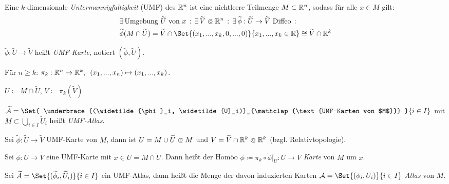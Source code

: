 \documentclass{cheat-sheet}
\newcommand{\Atlas}{\mathcal{A}} %
\theoremstyle{definition}
\begin{document}
\begin{defn}
  Eine $k$-dimensionale \emph{Untermannigfaltigkeit} (UMF) des $\mathbb{R}^n$ ist eine nichtleere Teilmenge $M \subset \mathbb{R}^n$, sodass für alle $x \in M$ gilt:
  \begin{align*}
    & \ex{\text{Umgebung $\widetilde{U}$ von $x$}} \ex{\widetilde{V} \opn \R^n} \ex{\widetilde{\phi} : \widetilde{U} \to \widetilde{V} \text{ Diffeo}} \\
    & \widetilde{\phi}(M \cap \widetilde{U}) = \widetilde{V} \cap \Set{ (x_1, ..., x_k, 0, ..., 0) }{ x_1, ..., x_k \in \R } \cong \widetilde{V} \cap \R^k
  \end{align*}
\end{defn}

\begin{nomenklatur}
  $\widetilde{\phi} : \widetilde{U} \to \widetilde{V}$ heißt \emph{UMF-Karte}, notiert $(\widetilde{\phi}, \widetilde{U})$.
\end{nomenklatur}

\begin{nota}
  Für $n \geq k$: $\pi_k : \mathbb{R}^n \to \mathbb{R}^k, \enspace (x_1, ..., x_n) \mapsto (x_1, ..., x_k)$.
\end{nota}

\begin{nota}
  $U \coloneqq M \cap \widetilde{U}$, \enspace $V \coloneqq \pi_k(\widetilde{V})$
\end{nota}

\begin{defn}
  $\widetilde{\Atlas} = \Set{ \underbrace{(\widetilde{\phi}_i, \widetilde{U}_i)}_{\mathclap{\text{UMF-Karten von $M$}}} }{ i \in I }$ mit $M \subset \bigcup_{i \in I} \widetilde{U}_i$ heißt \emph{UMF-Atlas}. %
\end{defn}

\begin{beob}
  Sei $\widetilde{\phi} : \widetilde{U} \to \widetilde{V}$ UMF-Karte von $M$, dann ist $U = M \cup \widetilde{U} \opn M$ und $V = \widetilde{V} \cap \R^k \opn \R^k$ (bzgl. Relativtopologie).
\end{beob}

\begin{defn}
  Sei $\widetilde{\phi} : \widetilde{U} \to \widetilde{V}$ eine UMF-Karte mit $x \in U = M \cap \widetilde{U}$. Dann heißt der Homöo $\phi \coloneqq \pi_k \circ \widetilde{\phi}|_{U} : U \to V$ \emph{Karte} von $M$ um $x$.
\end{defn}

\begin{defn}
  Sei $\widetilde{A} = \Set{ (\widetilde{\phi}_i, \widetilde{U}_i) }{ i \in I }$ ein UMF-Atlas, dann heißt die Menge der davon induzierten Karten $\Atlas = \Set{ (\phi_i, U_i) }{ i \in I }$ \emph{Atlas} von $M$.
\end{defn}
\end{document}
